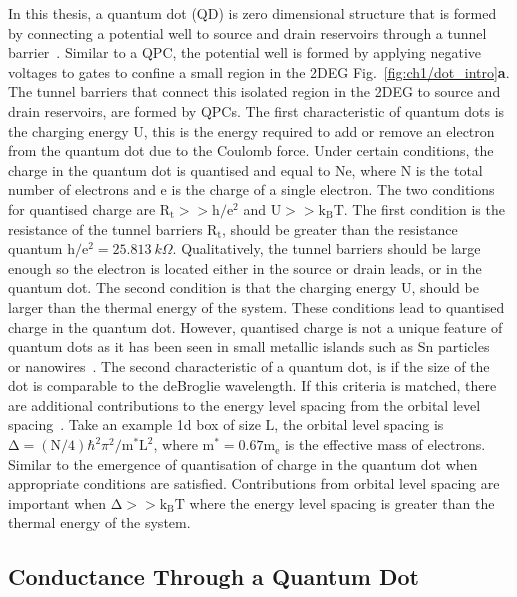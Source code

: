 In this thesis, a quantum dot (QD) is zero dimensional structure that is formed by connecting a potential well to source and drain reservoirs through a tunnel barrier~\cite{spins_in_qd}. Similar to a QPC, the potential well is formed by applying negative voltages to gates to confine a small region in the 2DEG Fig.~\ref{fig:ch1/dot_intro}\textbf{a}. The tunnel barriers that connect this isolated region in the 2DEG to source and drain reservoirs, are formed by QPCs. The first characteristic of quantum dots is the charging energy $\mathrm{U}$, this is the energy required to add or remove an electron from the quantum dot due to the Coulomb force. 
Under certain conditions, the charge in the quantum dot is quantised and equal to $\mathrm{Ne}$, where $\mathrm{N}$ is the total number of electrons and $\mathrm{e}$ is the charge of a single electron. The two conditions for quantised charge are $\mathrm{R_t}>>\mathrm{h/e^2}$ and $\mathrm{U}>>\mathrm{k_BT}$. The first condition is the resistance of the tunnel barriers $\mathrm{R_t}$, should be greater than the resistance quantum $\mathrm{h/e^2}=\qty{25.813}{k\Omega}$. Qualitatively, the tunnel barriers should be large enough so the electron is located either in the source or drain leads, or in the quantum dot. The second condition is that the charging energy $\mathrm{U}$, should be larger than the thermal energy of the system. These conditions lead to quantised charge in the quantum dot. However, quantised charge is not a unique feature of quantum dots as it has been seen in small metallic islands such as Sn particles~\cite{first_quantised_charge} or nanowires~\cite{nanowire_quantisedcharge}.
The second characteristic of a quantum dot, is if the size of the dot is comparable to the deBroglie wavelength. If this criteria is matched, there are additional contributions to the energy level spacing from the orbital level spacing~\cite{Kouwenhoven_1997_electron_transport}. Take an example 1d box of size $\mathrm{L}$, the orbital level spacing is $\mathrm{\Delta}=(\mathrm{N}/4)\hbar^2\pi^2 / \mathrm{m^*L^2}$, where $\mathrm{m^*}=0.67\mathrm{m_e}$ is the effective mass of electrons. Similar to the emergence of quantisation of charge in the quantum dot when appropriate conditions are satisfied. Contributions from orbital level spacing are important when $\mathrm{\Delta}>>\mathrm{k_BT}$ where the energy level spacing is greater than the thermal energy of the system. 

\afterpage{\clearpage}
\subsection{Conductance Through a Quantum Dot}


